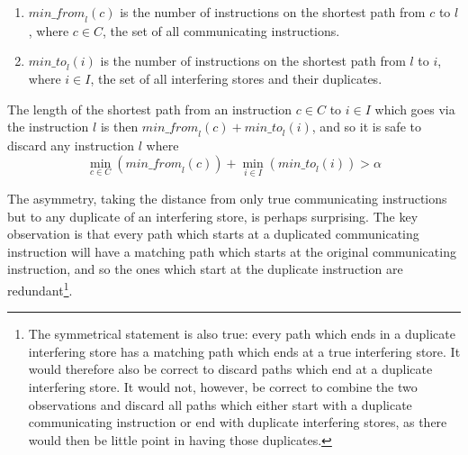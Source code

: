 \begin{enumerate}
\item
  $\mathit{min\_from}_l(c)$ is the number of instructions on the
  shortest path from $c$ to $l$, where $c \in C$, the set of all
  communicating instructions.
\item
  $\mathit{min\_to}_l(i)$ is the number of instructions on the
  shortest path from $l$ to $i$, where $i \in I$, the set of all
  interfering stores and their duplicates.
\end{enumerate}

The length of the shortest path from an instruction $c \in C$ to $i
\in I$ which goes via the instruction $l$ is then
$\mathit{min\_from}_l(c) + \mathit{min\_to}_l(i)$, and so it is safe
to discard any instruction $l$ where
\begin{displaymath}
\min_{c \in C}\left(\mathit{min\_from}_l(c)\right) + \min_{i \in I}\left(\mathit{min\_to}_l(i)\right) > \alpha
\end{displaymath}

The asymmetry, taking the distance from only true communicating
instructions but to any duplicate of an interfering store, is perhaps
surprising.  The key observation is that every path which starts at a
duplicated communicating instruction will have a matching path which
starts at the original communicating instruction, and so the ones
which start at the duplicate instruction are redundant\footnote{The
  symmetrical statement is also true: every path which ends in a
  duplicate interfering store has a matching path which ends at a true
  interfering store.  It would therefore also be correct to discard
  paths which end at a duplicate interfering store.  It would not,
  however, be correct to combine the two observations and discard all
  paths which either start with a duplicate communicating instruction
  or end with duplicate interfering stores, as there would then be
  little point in having those duplicates.}.

